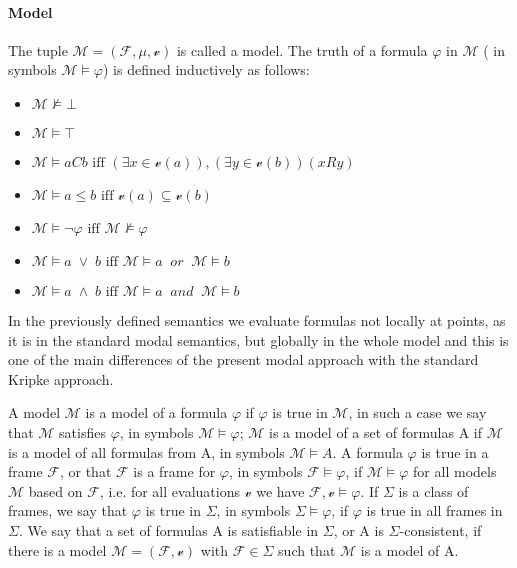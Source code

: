 \documentclass{article}
\begin{document}
	\paragraph{Model}
		\label{formula-satisfiability-model} 
		The tuple $\mathcal{M} = (\mathcal{F}, \mu, \mathscr{v})$ is called a model. The truth of a formula $\varphi$ in $\mathcal{M}$ ( in symbols $\mathcal{M} \models \varphi$) is defined inductively as follows:
		\begin{itemize}
			\item $\mathcal{M} \not\models \bot$ 
			\item $\mathcal{M} \models \top$
			\item $\mathcal{M} \models aCb \text{ iff } (\exists x \in \mathscr{v}(a)), (\exists y \in \mathscr{v}(b)) (xRy)$
			\item $\mathcal{M} \models a \leq b \text{ iff } \mathscr{v}(a) \subseteq \mathscr{v}(b)$
			\item $\mathcal{M} \models \neg \varphi \text{ iff } \mathcal{M} \not\models \varphi$
			\item $\mathcal{M} \models a \; \vee \; b \text{ iff } \mathcal{M} \models a \: \textit{ or } \: \mathcal{M} \models b$
			\item $\mathcal{M} \models a \; \wedge \; b \text{ iff } \mathcal{M} \models a \: \textit{ and } \: \mathcal{M} \models b$
		\end{itemize}
In the previously defined semantics we evaluate formulas not locally at points, as it is in the standard modal semantics, but globally in the whole model and this is one of the main differences of the present modal approach with the standard Kripke approach.

A model $\mathcal{M}$ is a model of a formula $\varphi$ if $\varphi$ is true in $\mathcal{M}$, in such a case we say that $\mathcal{M}$ satisfies $\varphi$, in symbols $\mathcal{M} \models \varphi$;
$\mathcal{M}$ is a model of a set of formulas A if $\mathcal{M}$ is a model of all formulas from A, in symbols $\mathcal{M} \models A$. A formula $\varphi$ is true in a frame $\mathcal{F}$, or that $\mathcal{F}$ is a frame for $\varphi$, in symbols $\mathcal{F} \models \varphi$,
if $\mathcal{M} \models \varphi$ for all models $\mathcal{M}$ based on $\mathcal{F}$, i.e. for all evaluations $\mathscr{v}$ we have $\mathcal{F}, \mathscr{v} \models \varphi$.
If $\Sigma$ is a class of frames, we say that $\varphi$ is true in $\Sigma$, in symbols $\Sigma \models \varphi$, if $\varphi$ is true in all frames in $\Sigma$. We say that a set of 
formulas A is satisfiable in $\Sigma$, or A is $\Sigma$-consistent, if there is a model $\mathcal{M} = (\mathcal{F}, \mathscr{v})$ with $\mathcal{F} \in \Sigma$ such that $\mathcal{M}$
is a model of A.
\end{document}
